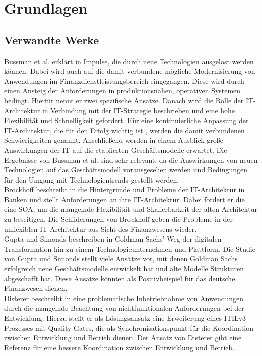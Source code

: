 \chapter{Grundlagen}

\section{Verwandte Werke}
Bussman et al. erklärt in \cite{Bussmann2006} Impulse, die durch neue Technologien ausgelöst werden können. Dabei wird auch auf die damit verbundene mögliche Modernisierung von Anwendungen im Finanzdienstleistungsbereich eingegangen. Diese wird durch einen Ansteig der Anforderungen in produktionsnahen, operativen Systemen \cite{Bussmann2006, Brockhoff2006} bedingt. Hierfür nennt er zwei spezifische Ansätze. Danach wird die Rolle der IT-Architektur in Verbindung mit der IT-Strategie beschrieben und eine hohe Flexibilität und Schnelligkeit gefordert. Für eine kontinuierliche Anpassung der IT-Architektur, die für den Erfolg wichtig ist \cite{Bussmann2006}, werden die damit verbundenen Schwierigkeiten genannt. Anschließend werden in einem Ausblick große Auswirkungen der IT auf die etablierten Geschäftsmodelle erwartet. Die Ergebnisse von Bussman et al. sind sehr relevant, da die Auswirkungen von neuen Technologien auf das Geschäftsmodell vorausgesehen werden und Bedingungen für den Umgang mit Technologientrends gestellt werden.
\medskip
\\
Brockhoff beschreibt in \cite{Brockhoff2006} die Hintergründe und Probleme der IT-Architektur in Banken und stellt Anforderungen an ihre IT-Architektur. Dabei fordert er die eine \ac{SOA}, um die mangelnde Flexibilität und Skalierbarkeit der alten Architektur zu beseitigen. Die Schilderungen von Brockhoff geben die Probleme in der unflexiblen IT-Architektur aus Sicht des Finanzwesens wieder.
\medskip
\\
Gupta und Simonds beschreiben in \cite{Gupta:2017} Goldman Sachs' Weg der digitalen Transformation hin zu einem Technologieunternehmen und Plattform. 
Die Studie von Gupta und Simonds stellt viele Ansätze vor, mit denen Goldman Sachs erfolgreich neue Geschäftsmodelle entwickelt hat und alte Modelle Strukturen abgeschafft hat. Diese Ansätze könnten als Positivbeispiel für das deutsche Finanzwesen dienen.
\medskip
\\
Disterer beschreibt in \cite{mci/Disterer2011} eine problematische Inbetriebnahme von Anwendungen durch die mangelnde Beachtung von nichtfunktionalen Anforderungen bei der Entwicklung. Hierzu stellt er als Lösungsansatz eine Erweiterung eines ITILv3 Prozesses mit Quality Gates, die als Synchronisationspunkt für die Koordination zwischen Entwicklung und Betrieb dienen. Der Ansatz von Disterer gibt eine Referenz für eine bessere Koordination zwischen Entwicklung und Betrieb.
